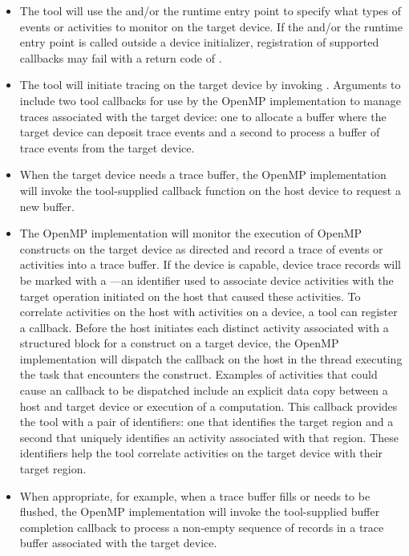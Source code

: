 \begin{itemize}
\item The tool will use the 
  and/or the  runtime entry point to specify what
  types of events or activities to monitor on the target device.
  If the  and/or the
   runtime entry point is called outside a device
  initializer, registration of supported callbacks may fail with a return code of
  .
\item The tool will initiate tracing on the target device by
  invoking . Arguments to 
  include two tool callbacks for use by the OpenMP implementation to manage
  traces associated with the target device: one to allocate
  a buffer where the target device can deposit trace events and a
  second to process a buffer of trace events from the target device.
\item When the target device needs a trace buffer, the OpenMP implementation
  will invoke the tool-supplied callback function on the host device to request a new buffer.
\item The OpenMP implementation will monitor the execution of OpenMP constructs on the target device as
  directed and record a trace of events or activities into a trace
  buffer. If the device is capable, device trace records will be
  marked with a ---an identifier used to associate
  device activities with the target operation initiated on the host
  that caused these activities.  To correlate activities on the host
  with activities on a device, a tool can register a
   callback.
  Before the host initiates each distinct activity associated with a structured block for a  construct
  on a target device, the OpenMP implementation will dispatch the  callback
  on the host in the thread executing the task that encounters the  construct.
  Examples of activities that could cause an  callback to be dispatched
  include an explicit data copy between a host and target device or execution of a computation.
  This callback provides the tool with a pair of identifiers: one that identifies the target region and a second
  that uniquely identifies an activity associated with that region.
  These identifiers help the tool correlate activities on the target device with their target region.
\item When appropriate, for example, when a trace buffer fills or needs to be
  flushed, the OpenMP implementation will invoke the tool-supplied buffer
  completion callback to process a non-empty sequence of
  records in a trace buffer associated with the target device.


\end{itemize}
